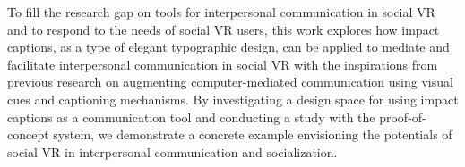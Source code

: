 To fill the research gap on tools for interpersonal communication in social VR and to respond to the needs of social VR users, this work explores how impact captions, as a type of elegant typographic design, can be applied to mediate and facilitate interpersonal communication in social VR with the inspirations from previous research on augmenting computer-mediated communication using visual cues and captioning mechanisms.
By investigating a design space for using impact captions as a communication tool and conducting a study with the proof-of-concept system, we demonstrate a concrete example envisioning the potentials of social VR in interpersonal communication and socialization.

